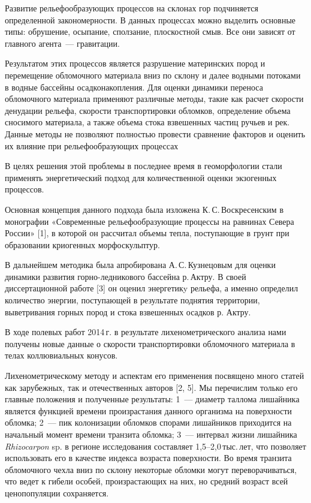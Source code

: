  

\makeProcTitle
{}

Развитие рельефообразующих процессов на склонах гор подчиняется определенной
закономерности. В данных процессах можно выделить основные типы: обрушение,
осыпание, сползание, плоскостной смыв. Все они зависят от главного агента~---
гравитации.

Результатом этих процессов является разрушение материнских пород и перемещение
обломочного материала вниз по склону и далее водными потоками в водные бассейны
осадконакопления. Для оценки динамики переноса обломочного материала применяют
различные методы, такие как расчет скорости денудации рельефа, скорости
транспортировки обломков, определение объема сносимого материала, а также объема
стока взвешенных частиц ручьев и рек. Данные методы не позволяют полностью
провести сравнение факторов и оценить их влияние при рельефообразующих
процессах

В целях решения этой проблемы в последнее время в геоморфологии стали применять
энергетический подход для количественной оценки экзогенных процессов.

Основная концепция данного подхода была изложена К.\,С.\,Воскресенским в
монографии «Современные рельефообразующие процессы на равнинах Севера России»
[1], в которой он рассчитал объемы тепла, поступающие в грунт при образовании
криогенных морфоскульптур.

В дальнейшем методика была апробирована А.\,С.\,Кузнецовым для оценки динамики
развития горно-ледникового бассейна р.\,Актру. В своей диссертационной работе [3]
он оценил энергетикy рельефа, а именно определил количество энергии, поступающей
в результате поднятия территории, выветривания горных пород и стока
взвешенных осадков р. Актру.

В ходе полевых работ 2014\,г. в результате лихенометрического анализа нами
получены новые данные о скорости транспортировки обломочного материала в телах
коллювиальных конусов. 

Лихенометрическому методу и аспектам его применения посвящено много статей как
зарубежных, так и отечественных авторов [2, 5]. Мы перечислим только его главные
положения и полученные результаты: 1~--- диаметр таллома лишайника является
функцией времени произрастания данного организма на поверхности обломка; 2~--- пик
колонизации обломков спорами лишайников приходится на начальный момент времени
транзита обломка; 3~--- интервал жизни лишайника \emph{Rhizocarpon} sp. в регионе
исследования составляет 1,5--2,0\,тыс.\,лет, что позволяет использовать его в
качестве индекса возраста поверхности. Во время транзита обломочного чехла вниз
по склону некоторые обломки могут переворачиваться, что ведет к гибели особей,
произрастающих на них, но средний возраст всей ценопопуляции сохраняется. 

